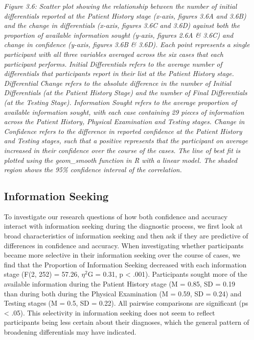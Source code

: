 \documentclass[a4paper, nobind]{templates/ociamthesis}
\begin{document}
\emph{Figure 3.6: Scatter plot showing the relationship between the number of initial differentials reported at the Patient History stage (x-axis, figures 3.6A and 3.6B) and the change in differentials (x-axis, figures 3.6C and 3.6D) against both the proportion of available information sought (y-axis, figures 2.6A \& 3.6C) and change in confidence (y-axis, figures 3.6B \& 3.6D). Each point represents a single participant with all three variables averaged across the six cases that each participant performs. Initial Differentials refers to the average number of differentials that participants report in their list at the Patient History stage. Differential Change refers to the absolute difference in the number of Initial Differentials (at the Patient History Stage) and the number of Final Differentials (at the Testing Stage). Information Sought refers to the average proportion of available information sought, with each case containing 29 pieces of information across the Patient History, Physical Examination and Testing stages. Change in Confidence refers to the difference in reported confidence at the Patient History and Testing stages, such that a positive represents that the participant on average increased in their confidence over the course of the cases. The line of best fit is plotted using the geom\_smooth function in R with a linear model. The shaded region shows the 95\% confidence interval of the correlation.}

\newpage

\subsection*{Information Seeking}\label{information-seeking}

To investigate our research questions of how both confidence and accuracy interact with information seeking during the diagnostic process, we first look at broad characteristics of information seeking and then ask if they are predictive of differences in confidence and accuracy. When investigating whether participants became more selective in their information seeking over the course of cases, we find that the Proportion of Information Seeking decreased with each information stage (F(2, 252) = 57.26, \(\eta^2\)G = 0.31, p \textless{} .001). Participants sought more of the available information during the Patient History stage (M = 0.85, SD = 0.19 than during both during the Physical Examination (M = 0.59, SD = 0.24) and Testing stages (M = 0.5, SD = 0.22). All pairwise comparisons are significant (ps \textless{} .05). This selectivity in information seeking does not seem to reflect participants being less certain about their diagnoses, which the general pattern of broadening differentials may have indicated.\\
\end{document}
